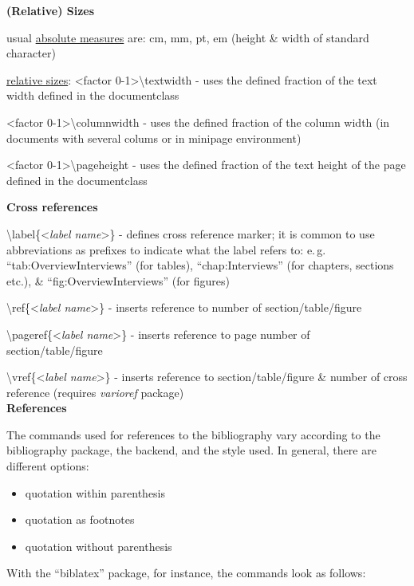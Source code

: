 \documentclass[a4paper,12pt,final]{article}
\begin{document}
\large \textbf{(Relative) Sizes} \normalsize

usual \uline{absolute measures} are: cm, mm, pt, em (height \& width of standard character) 

\uline{relative sizes}: <factor 0-1>\textbackslash textwidth - uses the defined fraction of the text width defined in the documentclass 

 <factor 0-1>\textbackslash columnwidth - uses the defined fraction of the column width (in documents with several colums or in minipage environment) 

<factor 0-1>\textbackslash pageheight - uses the defined fraction of the text height of the page defined in the documentclass 


\newpage
\large \textbf{Cross references}
\normalsize

\textbackslash label\{<\textsl{label name}>\} - defines cross reference marker; it is common to use abbreviations as prefixes to indicate what the label refers to: e.\,g. ``tab:OverviewInterviews'' (for tables), ``chap:Interviews'' (for chapters, sections etc.), \& ``fig:OverviewInterviews'' (for figures) 

\textbackslash ref\{<\textsl{label name}>\} - inserts reference to  number of section/table/figure 

\textbackslash pageref\{<\textsl{label name}>\} - inserts reference to page number of section/table/figure 

\textbackslash vref\{<\textsl{label name}>\} - inserts reference to section/table/figure \& number of cross reference (requires \textsl{varioref} package) \\


\large
\textbf{References}
\normalsize

The commands used for references to the bibliography vary according to the bibliography package, the backend, and the style used. In general, there are different options: 
\begin{itemize}
	\item quotation within parenthesis 
	\item quotation as footnotes 
	\item quotation without parenthesis 
\end{itemize}

With the ``biblatex'' package, for instance, the commands look as follows: 
\end{document}
